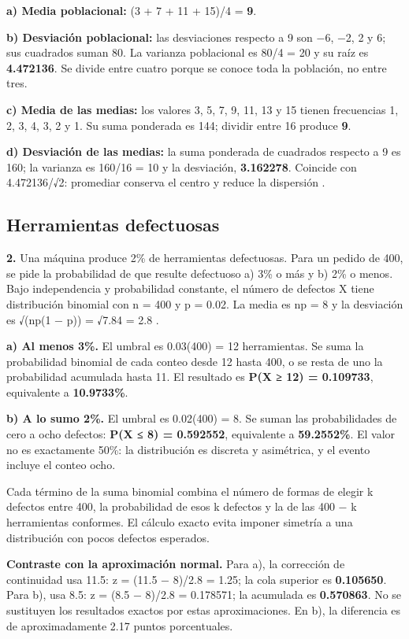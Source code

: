 {\textbf{a) Media poblacional:} (3 + 7 + 11 + 15)/4 = \textbf{9}.

\textbf{b) Desviación poblacional:} las desviaciones respecto a 9 son −6, −2, 2 y 6; sus cuadrados suman 80. La varianza poblacional es 80/4 = 20 y su raíz es \textbf{4.472136}. Se divide entre cuatro porque se conoce toda la población, no entre tres.

\textbf{c) Media de las medias:} los valores 3, 5, 7, 9, 11, 13 y 15 tienen frecuencias 1, 2, 3, 4, 3, 2 y 1. Su suma ponderada es 144; dividir entre 16 produce \textbf{9}.

\textbf{d) Desviación de las medias:} la suma ponderada de cuadrados respecto a 9 es 160; la varianza es 160/16 = 10 y la desviación, \textbf{3.162278}. Coincide con 4.472136/√2: promediar conserva el centro y reduce la dispersión \citep{holmesBusiness2023}.

\clearpage
\subsection{Herramientas defectuosas}
\textbf{2.} Una máquina produce 2\% de herramientas defectuosas. Para un pedido de 400, se pide la probabilidad de que resulte defectuoso a) 3\% o más y b) 2\% o menos. Bajo independencia y probabilidad constante, el número de defectos X tiene distribución binomial con n = 400 y p = 0.02. La media es np = 8 y la desviación es √(np(1 − p)) = √7.84 = 2.8 \citep{holmesBusiness2023}.

\textbf{a) Al menos 3\%.} El umbral es 0.03(400) = 12 herramientas. Se suma la probabilidad binomial de cada conteo desde 12 hasta 400, o se resta de uno la probabilidad acumulada hasta 11. El resultado es \textbf{P(X ≥ 12) = 0.109733}, equivalente a \textbf{10.9733\%}.

\textbf{b) A lo sumo 2\%.} El umbral es 0.02(400) = 8. Se suman las probabilidades de cero a ocho defectos: \textbf{P(X ≤ 8) = 0.592552}, equivalente a \textbf{59.2552\%}. El valor no es exactamente 50\%: la distribución es discreta y asimétrica, y el evento incluye el conteo ocho.

Cada término de la suma binomial combina el número de formas de elegir k defectos entre 400, la probabilidad de esos k defectos y la de las 400 − k herramientas conformes. El cálculo exacto evita imponer simetría a una distribución con pocos defectos esperados.

\textbf{Contraste con la aproximación normal.} Para a), la corrección de continuidad usa 11.5: z = (11.5 − 8)/2.8 = 1.25; la cola superior es \textbf{0.105650}. Para b), usa 8.5: z = (8.5 − 8)/2.8 = 0.178571; la acumulada es \textbf{0.570863}. No se sustituyen los resultados exactos por estas aproximaciones. En b), la diferencia es de aproximadamente 2.17 puntos porcentuales.

}
